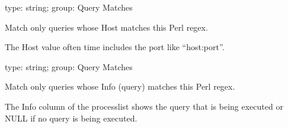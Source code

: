 \documentclass[letterpaper,10pt,english]{sphinxmanual}
\begin{document}
\begin{fulllineitems}
\label{\detokenize{mariadb-kill:cmdoption-mariadb-kill-match-host}}
type: string; group: Query Matches

Match only queries whose Host matches this Perl regex.

The Host value often time includes the port like “host:port”.

\end{fulllineitems}


\begin{fulllineitems}
\label{\detokenize{mariadb-kill:cmdoption-mariadb-kill-match-info}}
type: string; group: Query Matches

Match only queries whose Info (query) matches this Perl regex.

The Info column of the processlist shows the query that is being executed
or NULL if no query is being executed.

\end{fulllineitems}

\end{document}

